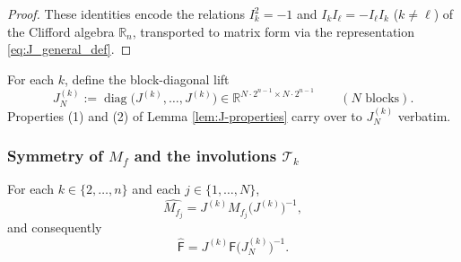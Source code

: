 \documentclass[11pt]{amsart}
\begin{document}
\begin{proof}
These identities encode the relations $I_k^2 = -1$ and $I_k I_\ell = -I_\ell I_k$ ($k \ne \ell$) of the Clifford algebra $\mathbb{R}_n$, transported to matrix form via the representation \eqref{eq:J_general_def}.
\end{proof}

For each $k$, define the block-diagonal lift
\[
J_N^{(k)} := \operatorname{diag}\bigl(J^{(k)}, \ldots, J^{(k)}\bigr) \in \mathbb{R}^{N\cdot 2^{n-1}\times N\cdot 2^{n-1}}\qquad (N \text{ blocks}).
\]
Properties (1) and (2) of Lemma \ref{lem:J-properties} carry over to $J_N^{(k)}$ verbatim.

\subsubsection{Symmetry of $M_f$ and the involutions $\mathcal T_k$}

\begin{lemma}\label{lem:symmetry-Mf-general}
For each $k \in \{2, \ldots, n\}$ and each $j \in \{1, \ldots, N\}$,
\begin{equation}\label{eq:symmetry_Mf_general}
\widehat{M_{f_j}} = J^{(k)} M_{f_j} \bigl(J^{(k)}\bigr)^{-1},
\end{equation}
and consequently
\begin{equation}\label{eq:symmetry_blockF_general}
\widehat{\mathsf{F}} = J^{(k)} \mathsf{F} \bigl(J_N^{(k)}\bigr)^{-1}.
\end{equation}
\end{lemma}
\end{document}
